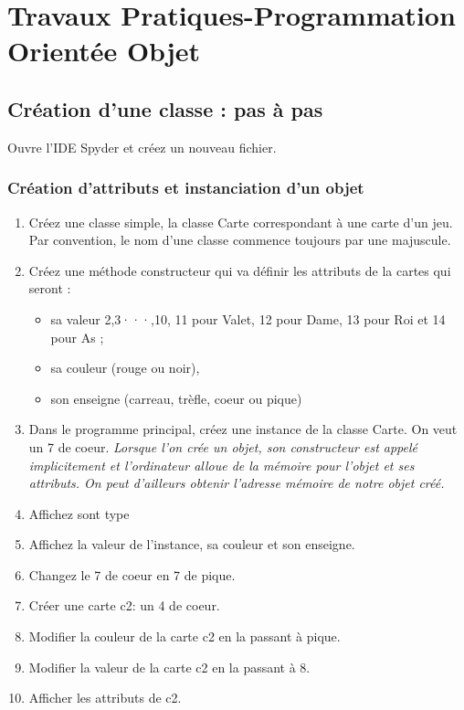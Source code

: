 \chapter*{Travaux Pratiques-Programmation Orientée Objet}

\section*{Création d'une classe : pas à pas}
Ouvre l'IDE Spyder et créez un nouveau fichier.\\

\subsection*{Création d'attributs et instanciation d'un objet}
\begin{enumerate}
    \item Créez une classe simple, la classe Carte correspondant à une carte d'un jeu. Par convention, le nom d'une classe commence toujours par une majuscule.
\item Créez une méthode constructeur qui va définir les attributs de la cartes qui seront :
\begin{itemize}
    \item sa valeur 2,3···,10, 11 pour Valet, 12 pour  Dame, 13 pour Roi et 14 pour As ;
    \item sa couleur (rouge ou noir),
    \item son enseigne (carreau, trèfle, coeur ou pique)
\end{itemize}
\item Dans le programme principal, créez une instance de la classe Carte. On veut un 7 de coeur. \textit{Lorsque  l'on  crée  un  objet,  son  constructeur  est  appelé  implicitement  et  l'ordinateur  alloue  de  la mémoire pour l'objet et ses attributs. On peut d'ailleurs obtenir l'adresse mémoire de notre objet créé.}
\item Affichez sont type
\item Affichez la valeur de l'instance, sa couleur et son enseigne.
\item Changez le 7 de coeur en 7 de pique.
\item Créer une carte c2: un 4 de coeur.
\item Modifier la couleur de la carte c2 en la passant à pique.
\item Modifier la valeur de la carte c2 en la passant à 8.
\item Afficher les attributs de c2.
\end{enumerate}


